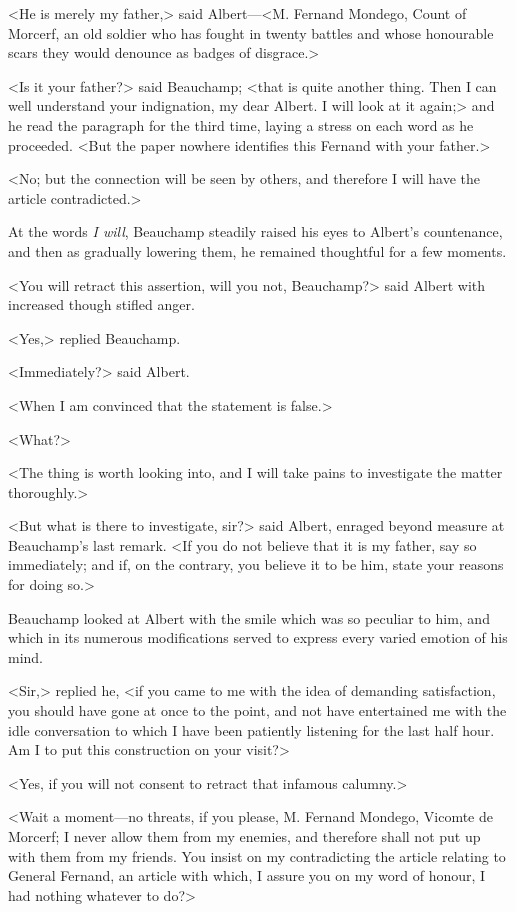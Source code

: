  <He is merely my father,> said Albert—<M. Fernand Mondego, Count of Morcerf, an old soldier who has fought in twenty battles and whose honourable scars they would denounce as badges of disgrace.> 

 <Is it your father?> said Beauchamp; <that is quite another thing. Then I can well understand your indignation, my dear Albert. I will look at it again;> and he read the paragraph for the third time, laying a stress on each word as he proceeded. <But the paper nowhere identifies this Fernand with your father.>

<No; but the connection will be seen by others, and therefore I will have the article contradicted.> 

 At the words \textit{I will}, Beauchamp steadily raised his eyes to Albert's countenance, and then as gradually lowering them, he remained thoughtful for a few moments. 

 <You will retract this assertion, will you not, Beauchamp?> said Albert with increased though stifled anger. 

 <Yes,> replied Beauchamp. 

 <Immediately?> said Albert. 

 <When I am convinced that the statement is false.> 

 <What?> 

 <The thing is worth looking into, and I will take pains to investigate the matter thoroughly.> 

 <But what is there to investigate, sir?> said Albert, enraged beyond measure at Beauchamp's last remark. <If you do not believe that it is my father, say so immediately; and if, on the contrary, you believe it to be him, state your reasons for doing so.> 

 Beauchamp looked at Albert with the smile which was so peculiar to him, and which in its numerous modifications served to express every varied emotion of his mind. 

 <Sir,> replied he, <if you came to me with the idea of demanding satisfaction, you should have gone at once to the point, and not have entertained me with the idle conversation to which I have been patiently listening for the last half hour. Am I to put this construction on your visit?> 

 <Yes, if you will not consent to retract that infamous calumny.> 

 <Wait a moment—no threats, if you please, M. Fernand Mondego, Vicomte de Morcerf; I never allow them from my enemies, and therefore shall not put up with them from my friends. You insist on my contradicting the article relating to General Fernand, an article with which, I assure you on my word of honour, I had nothing whatever to do?> 

